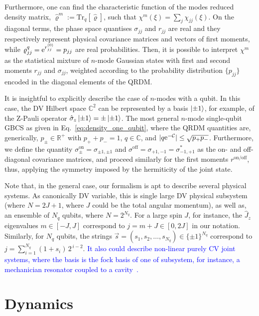 \documentclass[%
reprint,
superscriptaddress,
nofootinbib,
 amsmath,amssymb,
prx,
floatfix,
]{revtex4-2}
\begin{document}
Furthermore, one can find the characteristic function of the modes reduced density matrix, $\hat{\varrho}^m := \text{Tr}_q [\hat{\varrho}] $, such that $\chi^m (\xi) = \sum_{j} \chi_{jj} (\xi)$. On the diagonal terms, the phase space quantises $\sigma_{jj}$ and $r_{jj}$ are real and they respectively represent physical covariance matrices and vectors of first moments, while $\varrho^q_{jj} = {\rm e}^{r_{jj}^{(0)}} = p_{jj}$ are real probabilities. Then, it is possible to interpret $\chi^m$ as the statistical mixture of $n$-mode Gaussian states with first and second moments $r_{jj}$ and $\sigma_{jj}$, weighted according to the probability distribution $\{ p_{jj} \}$ encoded in the diagonal elements of the QRDM. 

It is insightful to explicitly describe the case of $n$-modes with a qubit.  In this case, the DV Hilbert space $\mathds{C}^{2}$ can be represented by a basis $\ket{\pm 1}$, for example, of the Z-Pauli operator $\hat{\sigma}_z \ket{\pm 1} = \pm \ket{\pm 1}$. The most general $n$-mode single-qubit GBCS as given in Eq.~\ref{eq:density_one_qubit}, where the QRDM quantities are, generically, $p_\pm \in \mathds{R}^+$ with $p_+ + p_- = 1$, $q \in \mathds{C}$, and $|q {\rm e}^{-\mathcal{C}}| \leq \sqrt{p_{+} p_{-}} $. Furthermore, we define the quantity $\sigma^{\text{on}}_\pm = \sigma_{\pm1 , \pm 1}$ and $\sigma^{\text{off}} = \sigma_{+ 1 , - 1} =  \sigma_{- 1 , + 1}^*$ as the on- and off-diagonal covariance matrices, and proceed similarly for the first moments $r^{\text{on/off}}$, thus, applying the symmetry imposed by the hermiticity of the joint state.

Note that, in the general case, our formalism is apt to describe several physical systems. As canonically DV variable, this is single large DV physical subsystem (where $N = 2 J +1 $, where $J$ could be the total angular momentum), as well as, an ensemble of $N_q$ qubits, where $N = 2^{N_q}$. For a large spin $J$, for instance, the $\hat{J}_z$ eigenvalues $m \in [-J, J]$ correspond to $j = m + J \in [0, 2J]$ in our notation. Similarly, for $N_q$ qubits, the strings $\vec{s} = (s_1,s_2, \dots, s_{N_q}) \in \{\pm 1\}^{N_q}$ correspond to $j = \sum_{i=1}^{N_q} (1+s_i)\, 2^{\,i-2}$. \textcolor{blue}{It also could describe non-linear purely CV joint systems, where the basis is the fock basis of one of subsystem, for instance, a mechanician resonator coupled to a cavity~\cite{bose_preparation_1997}.}


\section{Dynamics \label{sec:dynamics}}
\end{document}
